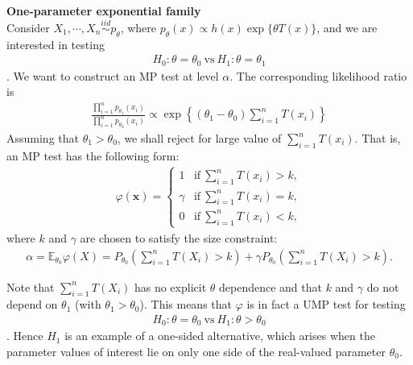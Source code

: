 \begin{example}
    \textbf{One-parameter exponential family}\\
    Consider $X_1,\cdots,X_n\overset{iid}{\sim}p_\theta$,
    where $p_\theta(x)\propto h(x)\exp\{\theta{T(x)}\}$,
    and we are interested in testing 
    \begin{gather}
        H_0:\theta=\theta_0~ \text{vs} ~H_1:\theta=\theta_1
    \end{gather}.
    We want to construct an MP test at level $\alpha$.
    The corresponding likelihood ratio is 
    \begin{gather}
        \frac{\prod_{i=1}^n p_{\theta_1}(x_i)}{\prod_{i=1}^n p_{\theta_0}(x_i)}
        \propto
        \exp\left\{
            (\theta_1-\theta_0)\sum_{i=1}^n{T(x_i)}
        \right\}
    \end{gather}
    Assuming that $\theta_1>\theta_0$,
    we shall reject for large value of $\sum_{i=1}^n T(x_i)$.
    That is, an MP test has the following form:
    \begin{gather}
    \varphi(\boldsymbol{x})=\left\{\begin{array}{ll}
        1       & \text{if}~\sum_{i=1}^n{T(x_i)}>k, \\
        \gamma  & \text{if}~\sum_{i=1}^n{T(x_i)}=k, \\
        0       & \text{if}~\sum_{i=1}^n{T(x_i)}<k,
    \end{array}\right.
    \end{gather}
    where $k$ and $\gamma$ are chosen to satisfy the size constraint:
    \begin{align}
        \alpha=\mathbb{E}_{\theta_0}\varphi(X)
        = P_{\theta_0}\left(\sum_{i=1}^n T(X_i)>k\right)
        + \gamma P_{\theta_0}\left(\sum_{i=1}^n T(X_i)>k\right).
    \end{align}

    Note that $\sum_{i=1}^n T(X_i)$ has no explicit $\theta$ dependence
    and that $k$ and $\gamma$ do not depend on $\theta_1$ (with $\theta_1>\theta_0$).
    This means that $\varphi$ is in fact a UMP test for testing 
    \begin{gather}
        H_0:\theta=\theta_0~ \text{vs} ~H_1:\theta>\theta_0
    \end{gather}.
    Hence $H_1$ is an example of a one-sided alternative,
    which arises when the parameter values of interest lie on only one side of the real-valued parameter $\theta_0$.
\end{example}

